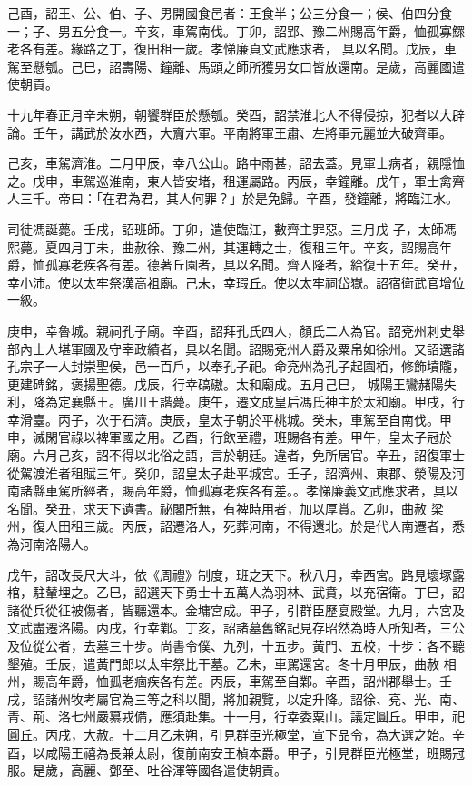 \begin{pinyinscope}
 己酉，詔王、公、伯、子、男開國食邑者：王食半；公三分食一；侯、伯四分食一；子、男五分食一。辛亥，車駕南伐。丁卯，詔郢、豫二州賜高年爵，恤孤寡鰥老各有差。緣路之丁，復田租一歲。孝悌廉貞文武應求者，
 具以名聞。戊辰，車駕至懸瓠。己巳，詔壽陽、鐘離、馬頭之師所獲男女口皆放還南。是歲，高麗國遣使朝貢。



 十九年春正月辛未朔，朝饗群臣於懸瓠。癸酉，詔禁淮北人不得侵掠，犯者以大辟論。壬午，講武於汝水西，大齎六軍。平南將軍王肅、左將軍元麗並大破齊軍。



 己亥，車駕濟淮。二月甲辰，幸八公山。路中雨甚，詔去蓋。見軍士病者，親隱恤之。戊申，車駕巡淮南，東人皆安堵，租運屬路。丙辰，幸鐘離。戊午，軍士禽齊人三千。帝曰：「在君為君，其人何罪？」於是免歸。辛酉，發鐘離，將臨江水。



 司徒馮誕薨。壬戌，詔班師。丁卯，遣使臨江，數齊主罪惡。三月戊
 子，太師馮熙薨。夏四月丁未，曲赦徐、豫二州，其運轉之士，復租三年。辛亥，詔賜高年爵，恤孤寡老疾各有差。德著丘園者，具以名聞。齊人降者，給復十五年。癸丑，幸小沛。使以太牢祭漢高祖廟。己未，幸瑕丘。使以太牢祠岱嶽。詔宿衛武官增位一級。



 庚申，幸魯城。親祠孔子廟。辛酉，詔拜孔氏四人，顏氏二人為官。詔兗州刺史舉部內士人堪軍國及守宰政績者，具以名聞。詔賜兗州人爵及粟帛如徐州。又詔選諸孔宗子一人封崇聖侯，邑一百戶，以奉孔子祀。命兗州為孔子起園栢，修飾墳隴，更建碑銘，褒揚聖德。戊辰，行幸碻磝。太和廟成。五月己巳，
 城陽王鸞赭陽失利，降為定襄縣王。廣川王諧薨。庚午，遷文成皇后馮氏神主於太和廟。甲戌，行幸滑臺。丙子，次于石濟。庚辰，皇太子朝於平桃城。癸未，車駕至自南伐。甲申，滅閑官祿以裨軍國之用。乙酉，行飲至禮，班賜各有差。甲午，皇太子冠於廟。六月己亥，詔不得以北俗之語，言於朝廷。違者，免所居官。辛丑，詔復軍士從駕渡淮者租賦三年。癸卯，詔皇太子赴平城宮。壬子，詔濟州、東郡、滎陽及河南諸縣車駕所經者，賜高年爵，恤孤寡老疾各有差。。孝悌廉義文武應求者，具以名聞。癸丑，求天下遺書。祕閣所無，有裨時用者，加以厚賞。乙卯，曲赦
 梁州，復人田租三歲。丙辰，詔遷洛人，死葬河南，不得還北。於是代人南遷者，悉為河南洛陽人。



 戊午，詔改長尺大斗，依《周禮》制度，班之天下。秋八月，幸西宮。路見壞塚露棺，駐輦埋之。乙巳，詔選天下勇士十五萬人為羽林、武賁，以充宿衛。丁巳，詔諸從兵從征被傷者，皆聽還本。金墉宮成。甲子，引群臣歷宴殿堂。九月，六宮及文武盡遷洛陽。丙戌，行幸鄴。丁亥，詔諸墓舊銘記見存昭然為時人所知者，三公及位從公者，去墓三十步。尚書令僕、九列，十五步。黃門、五校，十步：各不聽墾殖。壬辰，遣黃門郎以太牢祭比干墓。乙未，車駕還宮。冬十月甲辰，曲赦
 相州，賜高年爵，恤孤老痼疾各有差。丙辰，車駕至自鄴。辛酉，詔州郡舉士。壬戌，詔諸州牧考屬官為三等之科以聞，將加親覽，以定升降。詔徐、兗、光、南、青、荊、洛七州嚴纂戎備，應須赴集。十一月，行幸委粟山。議定圓丘。甲申，祀圓丘。丙戌，大赦。十二月乙未朔，引見群臣光極堂，宣下品令，為大選之始。辛酉，以咸陽王禧為長兼太尉，復前南安王楨本爵。甲子，引見群臣光極堂，班賜冠服。是歲，高麗、鄧至、吐谷渾等國各遣使朝貢。




\end{pinyinscope}
